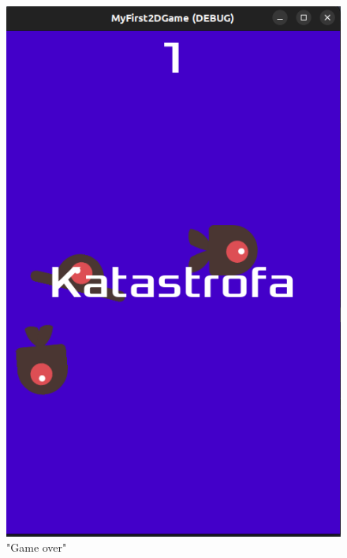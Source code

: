 \documentclass[a4paper]{article}
\begin{document}
\begin{sloppypar}
\begin{center}
\begin{figure}
			\includegraphics[height=0.35\textheight]{game_over.png}
			\caption{"Game over"}
		\end{figure}
	\end{center}
	\clearpage

\end{sloppypar}
\end{document}

